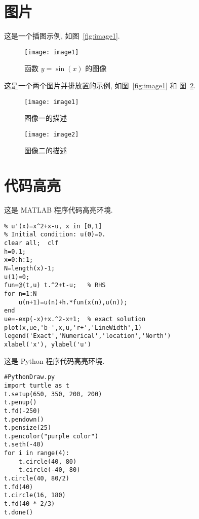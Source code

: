 \documentclass[cn,12pt]{homework}
\begin{document}
\section*{图片}
这是一个插图示例, 如图~\ref{fig:image1}.

\begin{figure}[htp!]
\centering
\texttt{[image: image1]}
\caption{函数 $y=\sin(x)$ 的图像}
\label{fig:sinx}
\end{figure}

这是一个两个图片并排放置的示例, 如图~\ref{fig:image1} 和 图~\ref{fig:image2}.

\begin{figure}[!htp]
\begin{minipage}[h]{0.48\linewidth}
\centering
\texttt{[image: image1]}
\caption{图像一的描述}
\label{fig:image1}
\end{minipage}
\begin{minipage}[h]{0.48\linewidth}
\centering
\texttt{[image: image2]}
\caption{图像二的描述}
\label{fig:image2}
\end{minipage}
\end{figure}


\clearpage
\section*{代码高亮}

这是 MATLAB 程序代码高亮环境.


\begin{lstlisting}[style=matlab,basicstyle=\footnotesize\fontspec{Courier New},title={MATLAB code}]
% Euler method for the ODE model
% u'(x)=x^2+x-u, x in [0,1]
% Initial condition: u(0)=0.
clear all;  clf
h=0.1;
x=0:h:1;
N=length(x)-1;
u(1)=0;
fun=@(t,u) t.^2+t-u;   % RHS
for n=1:N
    u(n+1)=u(n)+h.*fun(x(n),u(n));
end
ue=-exp(-x)+x.^2-x+1;  % exact solution
plot(x,ue,'b-',x,u,'r+','LineWidth',1)
legend('Exact','Numerical','location','North')
xlabel('x'), ylabel('u')
\end{lstlisting}

\medskip
这是 Python 程序代码高亮环境.

\begin{lstlisting}[style=python,basicstyle=\footnotesize\fontspec{Consolas},title={Python code}]
#PythonDraw.py
import turtle as t
t.setup(650, 350, 200, 200)
t.penup()
t.fd(-250)
t.pendown()
t.pensize(25)
t.pencolor("purple color")
t.seth(-40)
for i in range(4):
    t.circle(40, 80)
    t.circle(-40, 80)
t.circle(40, 80/2)
t.fd(40)
t.circle(16, 180)
t.fd(40 * 2/3)
t.done()
\end{lstlisting}
\end{document}
